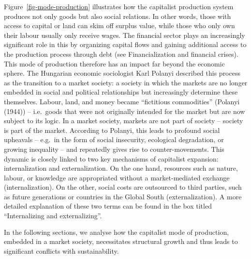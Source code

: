 \documentclass[
  a4paper,
  openany]{book}
\begin{document}
Figure~\ref{fig-mode-production} illustrates how the capitalist
production system produces not only goods but also social relations. In
other words, those with access to capital or land can skim off surplus
value, while those who only own their labour usually only receive wages.
The financial sector plays an increasingly significant role in this by
organizing capital flows and gaining additional access to the production
process through debt (see Financialization and financial crises). This
mode of production therefore has an impact far beyond the economic
sphere. The Hungarian economic sociologist Karl Polanyi described this
process as the transition to a market society: a society in which the
markets are no longer embedded in social and political relationships but
increasingly determine these themselves. Labour, land, and money became
``fictitious commodities'' (Polanyi (1944)) -- i.e.~goods that were not
originally intended for the market but are now subject to its logic. In
a market society, markets are not part of society -- society is part of
the market. According to Polanyi, this leads to profound social
upheavals -- e.g.~in the form of social insecurity, ecological
degradation, or growing inequality -- and repeatedly gives rise to
counter-movements. This dynamic is closely linked to two key mechanisms
of capitalist expansion: internalization and externalization. On the one
hand, resources such as nature, labour, or knowledge are appropriated
without a market-mediated exchange (internalization). On the other,
social costs are outsourced to third parties, such as future generations
or countries in the Global South (externalization). A more detailed
explanation of these two terms can be found in the box titled
``Internalizing and externalizing''.

In the following sections, we analyse how the capitalist mode of
production, embedded in a market society, necessitates structural growth
and thus leads to significant conflicts with sustainability.
\end{document}
